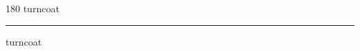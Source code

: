 
\begin{frame}
\begin{center}
\begin{turn}{180}
{\fontsize{2.5cm}{1em}\selectfont turncoat}
\end{turn}
\vspace{1em}\par  
\hrule
\vspace{1em}\par  
{\fontsize{2.5cm}{1em}\selectfont turncoat}
\end{center}
\end{frame}
